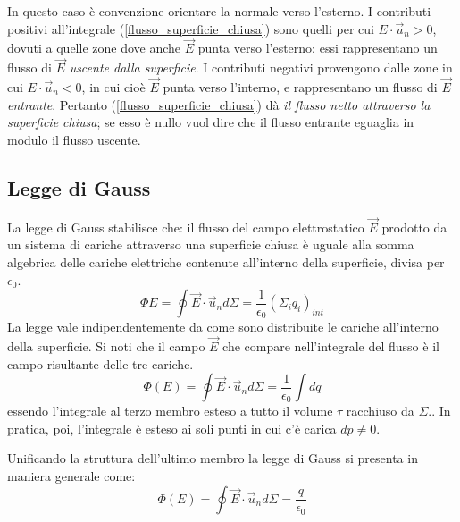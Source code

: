 \documentclass[class=book, crop=false, oneside, 12pt]{standalone}
\begin{document}
In questo caso è convenzione orientare la normale verso l'esterno. 
I contributi positivi all'integrale (\ref{flusso_superficie_chiusa}) sono quelli per cui \(E \cdot \overrightarrow{u}_n> 0\), dovuti a quelle zone dove anche \(\overrightarrow{E}\) punta verso l'esterno: essi rappresentano un flusso di \(\overrightarrow{E}\) \emph{uscente dalla superficie}. 
I contributi negativi provengono dalle zone in cui \(E \cdot \overrightarrow{u}_n < 0\), in cui cioè \(\overrightarrow{E}\) punta verso l'interno, e rappresentano un flusso di \(\overrightarrow{E}\) \emph{entrante}. 
Pertanto (\ref{flusso_superficie_chiusa}) dà \emph{il flusso netto attraverso la superficie chiusa}; se esso è nullo vuol dire che il flusso entrante eguaglia in modulo il flusso uscente.

\subsection{Legge di Gauss}

La legge di Gauss stabilisce che: 
il flusso del campo elettrostatico \(\overrightarrow{E}\) prodotto da un sistema di cariche attraverso una superficie chiusa è uguale alla somma algebrica delle cariche elettriche contenute all'interno della superficie, divisa per \(\epsilon_0\).
\begin{equation}
    \Phi E = \oint \overrightarrow{E} \cdot \overrightarrow{u}_n d \Sigma = \frac{1}{\epsilon_0} (\Sigma_i q_i)_{int}
\end{equation}
La legge vale indipendentemente da come sono distribuite le cariche all'interno della superficie.
Si noti che il campo \(\overrightarrow{E}\) che compare nell'integrale del flusso è il campo risultante delle tre cariche.
\begin{equation}
    \Phi (E) = \oint \overrightarrow{E} \cdot \overrightarrow{u}_n d \Sigma = \frac{1}{\epsilon_0} \int dq
\end{equation}
essendo l'integrale al terzo membro esteso a tutto il volume \(\tau\) racchiuso da \(\Sigma\).. 
In pratica, poi, l'integrale è esteso ai soli punti in cui c'è carica \(dp \neq 0\). 

Unificando la struttura dell'ultimo membro la legge di Gauss si presenta in maniera generale come:
\begin{equation}
    \Phi (E) = \oint \overrightarrow{E} \cdot \overrightarrow{u}_n d \Sigma = \frac{q}{\epsilon_0}
\end{equation}
\end{document}
